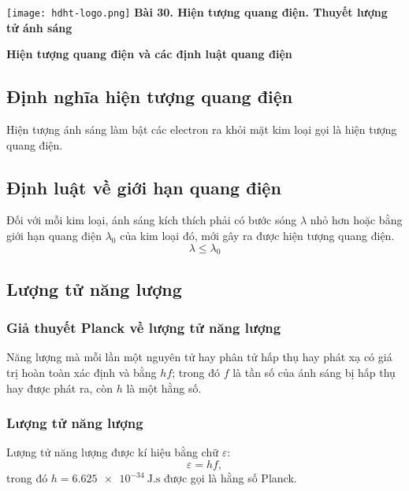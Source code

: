 \newcommand{\chapter}[2][]{
	\newcommand{\chapname}{#2}
	\begin{flushleft}
		\begin{minipage}[t]{\linewidth}
			\texttt{[image: hdht-logo.png]}
			\hspace{0pt}	
			\sffamily\bfseries\large Bài  30. Hiện tượng quang điện. Thuyết lượng tử ánh sáng
			\begin{flushleft}
				\huge\bfseries #1
			\end{flushleft}
		\end{minipage}
	\end{flushleft}
	\vspace{1cm}
	\normalfont\normalsize
}
\chapter[Hiện tượng quang điện và các định luật quang điện]{Hiện tượng quang điện và các định luật quang điện}

\subsection{Định nghĩa hiện tượng quang điện}
Hiện tượng ánh sáng làm bật các electron ra khỏi mặt kim loại gọi là hiện tượng quang điện.
\subsection{Định luật về giới hạn quang điện}
Đối với mỗi kim loại, ánh sáng kích thích phải có bước sóng $\lambda$ nhỏ hơn hoặc bằng giới hạn quang điện $\lambda_0$ của kim loại đó, mới gây ra được hiện tượng quang điện.
\begin{equation}
	\lambda \leq \lambda_0
\end{equation}
\subsection{Lượng tử năng lượng}
\subsubsection{Giả thuyết Planck về lượng tử năng lượng}
Năng lượng mà mỗi lần một nguyên tử hay phân tử hấp thụ hay phát xạ có giá trị hoàn toàn xác định và bằng $hf$; trong đó $f$ là tần số của ánh sáng bị hấp thụ hay được phát ra, còn $h$ là một hằng số.
\subsubsection{Lượng tử năng lượng}
Lượng tử năng lượng được kí hiệu bằng chữ $\varepsilon$:
\begin{equation}
	\varepsilon=hf,
\end{equation}
trong đó $h=\SI{6.625e-34}{\joule . \second}$ được gọi là hằng số Planck.